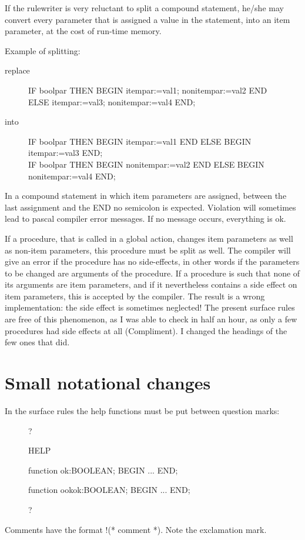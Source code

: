 If the rulewriter is very reluctant to split a compound statement, he/she may
convert every parameter that is assigned a value in the statement, into an
item parameter, at the cost of run-time memory.

Example of splitting:
\begin{description}
\item[replace] IF boolpar THEN BEGIN itempar:=val1; nonitempar:=val2 END\\
      ELSE itempar:=val3; nonitempar:=val4 END;
\item[into] IF boolpar THEN BEGIN itempar:=val1 END ELSE BEGIN itempar:=val3 END;\\
      IF boolpar THEN BEGIN nonitempar:=val2 END ELSE BEGIN nonitempar:=val4 END;
\end{description}
In a compound statement in which item parameters are assigned, between
the last assignment and the END no semicolon is expected. Violation will
sometimes lead to pascal compiler error messages. If no message occurs,
everything is ok.

If a procedure, that is called in a global action, changes item parameters as
well as non-item parameters, this procedure must be split as well.
The compiler will give an error if the procedure has no side-effects,
in other words if the parameters to be changed are arguments
of the procedure. If a procedure is such that none of its arguments are
item parameters, and if it nevertheless contains a side effect on item
parameters, this is accepted by the compiler. The result is
a wrong implementation: the side effect is sometimes neglected!
The present surface rules are free of this phenomenon, as I was able
to check in half an hour, as only a few procedures had side effects at
all (Compliment). I changed the headings of the few ones that did.
\section{Small notational changes}
In the surface rules the help functions must be put between question marks:
\begin{description}
\item[]?
\item[]HELP
\item[]function ok:BOOLEAN; BEGIN ... END;
\item[]function ookok:BOOLEAN; BEGIN ... END;
\item[]?
\end{description}
Comments have the format !(* comment *). Note the exclamation mark.
